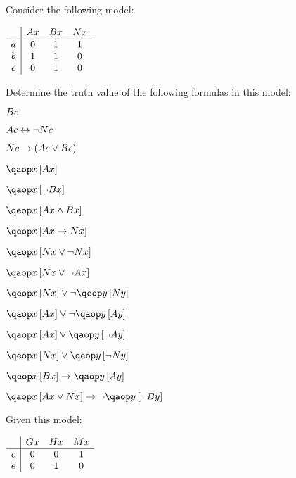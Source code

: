 \documentclass[PHIL101-Textbook.tex]{subfiles}
\begin{document}
 \solutions   
\noindent\problempart  \label{pr.quant01}
  Consider the following model:

  \begin{center}
  $\begin{array}{c|ccc}
	 & \mathord{A}{x} & \mathord{B}{x} & \mathord{N}{x} \\ \hline
	 a & 0 & 1 &1 \\
	 b & 1 & 1 & 0 \\
	 c & 0 & 1 & 0		  
   \end{array}$
\end{center}

Determine the truth value of the following formulas in this model:
\begin{earg}
\item $\mathord{B}{c} $
\item $\mathord{A}{c}  \leftrightarrow \neg \mathord{N}{c}$
\item $\mathord{N}{c}  \rightarrow (\mathord{A}{c} \vee \mathord{B}{c})$
\item $\qab{x}{\atom{A}{x}}$
\item $\qab{x}{\enot \atom{B}{x}}$
\item $\qeb{x}{\atom{A}{x} \eand \atom{B}{x}}$
\item $\qeb{x}{\atom{A}{x} \eif \atom{N}{x}}$
\item $\qab{x}{\atom{N}{x} \eor \enot \atom{N}{x}}$
\item $\qab{x}{\atom{N}{x} \eor \enot \atom{A}{x}}$
\item $\qeb{x}{\atom N x} \eor \enot \qeb{y}{\atom N y}$
\item $\qab{x}{\atom A x} \eor \enot \qab{y}{\atom A y}$
\item $\qab{x}{\atom A x} \eor \qab{y}{\enot\atom A y}$
\item $\qeb{x}{\atom N x} \eor \qeb{y}{\enot\atom N y}$
\item $\qeb{x}{\atom B x} \eif \qab{y}{\atom A y}$
\item $\qab{x}{\atom A x \eor \atom N x} \eif \enot \qab{y}{ \enot \atom B y}$
\end{earg}

\noindent\problempart
\label{pr.TorF2}

Given this model:

\begin{center}
  $\begin{array}{c|ccc}
	 & \mathord{G}{x} & \mathord{H}{x} & \mathord{M}{x} \\ \hline
	 c & 0 & 0 &1 \\
	 e & 0 & 1 & 0 \\
   \end{array}$
\end{center}
\end{document}
